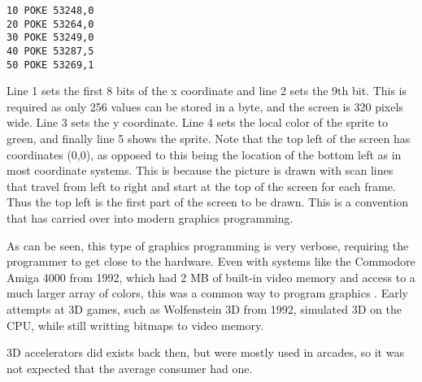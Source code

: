 \begin{lstlisting}[caption={Small BASIC program that places sprite 0 in the top left part of the screen.}]
10 POKE 53248,0
20 POKE 53264,0
30 POKE 53249,0
40 POKE 53287,5
50 POKE 53269,1
\end{lstlisting}


Line 1 sets the first 8 bits of the x coordinate and line 2 sets the 9th bit.
This is required as only 256 values can be stored in a byte, and the screen is 320 pixels wide.
Line 3 sets the y coordinate.
Line 4 sets the local color of the sprite to green, and finally line 5 shows the sprite.
Note that the top left of the screen has coordinates (0,0), as opposed to this being the location of the bottom left as in most coordinate systems.
This is because the picture is drawn with scan lines that travel from left to right and start at the top of the screen for each frame. 
Thus the top left is the first part of the screen to be drawn.
This is a convention that has carried over into modern graphics programming.


As can be seen, this type of graphics programming is very verbose, requiring the programmer to get close to the hardware.  
Even with systems like the Commodore Amiga 4000 from 1992, which had 2 MB of built-in video memory and access to a much larger array of colors, this was a common way to program graphics \cite{wikiAmiga4000}.
Early attempts at 3D games, such as Wolfenstein 3D from 1992, simulated 3D on the \gls{CPU}, while still writting bitmaps to video memory.





3D accelerators did exists back then, but were mostly used in arcades, so it was not expected that the average consumer had one.

